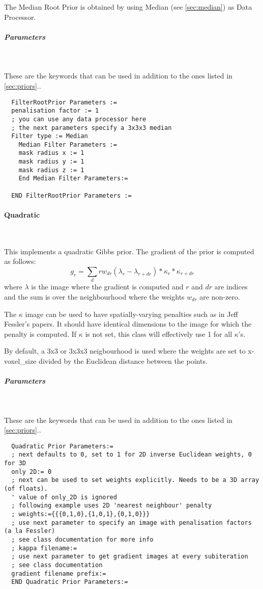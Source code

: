 \documentclass{article}
\newcommand{\subsubsubsection}[1]{\paragraph{#1}\mbox{} \\}
\newcommand{\subsubsubsubsection}[1]{\subparagraph{#1} \mbox{} \\}
\begin{document}
{The Median Root Prior is obtained by using Median (see \ref{sec:median}) 
as Data Processor.

{ \subsubsubsubsection{Parameters}
}
These are the keywords that can be used in addition to the ones listed in \ref{sec:priors}..
  \begin{verbatim}
  FilterRootPrior Parameters :=
  penalisation factor := 1
  ; you can use any data processor here
  ; the next parameters specify a 3x3x3 median
  Filter type := Median
    Median Filter Parameters :=
    mask radius x := 1   
    mask radius y := 1
    mask radius z := 1
    End Median Filter Parameters:=

  END FilterRootPrior Parameters :=
 \end{verbatim}


{ \subsubsubsection{Quadratic}
}
This implements a quadratic Gibbs prior. The gradient of the prior is computed as follows:
 \[
  g_r = \sum_dr w_{dr} (\lambda_r - \lambda_{r+dr}) * \kappa_r * \kappa_{r+dr}
  \]
  \noindent where $\lambda$ is the image where the gradient is computed
   and $r$ and $dr$ are indices and the sum
  is over the neighbourhood where the weights $w_{dr}$ are non-zero.

  The $\kappa$ image can be used to have spatially-varying penalties such as in 
  Jeff Fessler's papers. It should have identical dimensions to the image for which the
  penalty is computed. If $\kappa$ is not set, this class will effectively
  use 1 for all $\kappa$'s.

  By default, a 3x3 or 3x3x3 neigbourhood is used where the weights are set to 
  x-voxel\_size divided by the Euclidean distance between the points.
 
{ \subsubsubsubsection{Parameters}
}
  These are the keywords that can be used in addition to the ones listed in \ref{sec:priors}..
  \begin{verbatim}
  Quadratic Prior Parameters:=
  ; next defaults to 0, set to 1 for 2D inverse Euclidean weights, 0 for 3D 
  only 2D:= 0
  ; next can be used to set weights explicitly. Needs to be a 3D array (of floats).
  ' value of only_2D is ignored
  ; following example uses 2D 'nearest neighbour' penalty
  ; weights:={{{0,1,0},{1,0,1},{0,1,0}}}
  ; use next parameter to specify an image with penalisation factors (a la Fessler)
  ; see class documentation for more info
  ; kappa filename:=
  ; use next parameter to get gradient images at every subiteration
  ; see class documentation
  gradient filename prefix:= 
  END Quadratic Prior Parameters:=
  \end{verbatim}
  
}
\end{document}
